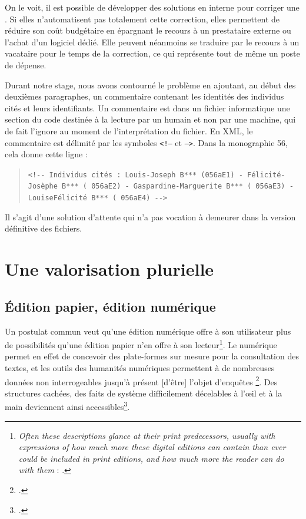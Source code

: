 On le voit, il est possible de développer des solutions en interne pour corriger une \ocr. Si elles n'automatisent pas totalement cette correction, elles permettent de réduire son coût budgétaire en épargnant le recours à un prestataire externe ou l'achat d'un logiciel dédié. Elle peuvent néanmoins se traduire par le recours à un vacataire pour le temps de la correction, ce qui représente tout de même un poste de dépense.

Durant notre stage, nous avons contourné le problème en ajoutant, au début des deuxièmes paragraphes, un commentaire contenant les identités des individus cités et leurs identifiants. Un commentaire est dans un fichier informatique une section du code destinée à la lecture par un humain et non par une machine, qui de fait l'ignore au moment de l'interprétation du fichier. En XML, le commentaire est délimité par les symboles \texttt{<!--} et \texttt{-->}. Dans la monographie \no{}56, cela donne cette ligne :

\begin{quote}
    \texttt{<!-{}- Individus cités : Louis-Joseph B*** (\no{}056aE1) - Félicité-Josèphe B*** (\no{} 056aE2) - Gaspardine-Marguerite B*** (\no{} 056aE3) - Louise\-Félicité B*** (\no{} 056aE4) -{}->}
\end{quote}

Il s'agit d'une solution d'attente qui n'a pas vocation à demeurer dans la version définitive des fichiers.

\chapter{Une valorisation plurielle}

\section{Édition papier, édition numérique}

Un postulat commun veut qu'une édition numérique offre à son utilisateur plus de possibilités qu'une édition papier n'en offre à son lecteur\footnote{\og \textit{Often these descriptions glance at their print predecessors, usually with expressions of how much more these digital editions can contain than ever could be included in print editions, and how much more the reader can do with them} \fg{} : \cite[p. 105-106]{robinson}.}. Le numérique permet en effet de concevoir des plate-formes sur mesure pour la consultation des textes, et les outils des humanités numériques permettent à \og de nombreuses données non interrogeables jusqu’à présent [d'être] l’objet d’enquêtes \fg\footcite[p. 20]{duval}. \og Des structures cachées, des faits de système difficilement décelables à l’œil et à la main \fg{} deviennent ainsi accessibles\footcite{duval}.

